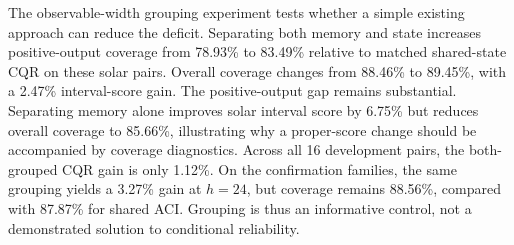 The observable-width grouping experiment tests whether a simple existing approach
can reduce the deficit. Separating both memory and state increases positive-output
coverage from 78.93\% to 83.49\% relative to matched shared-state CQR on these solar
pairs. Overall coverage changes from 88.46\% to 89.45\%, with a 2.47\% interval-score
gain. The positive-output gap remains substantial. Separating memory alone improves
solar interval score by 6.75\% but reduces overall coverage to 85.66\%, illustrating
why a proper-score change should be accompanied by coverage diagnostics.
Across all 16 development pairs, the both-grouped CQR gain is only 1.12\%.
On the confirmation families, the same grouping yields a 3.27\% gain at $h=24$,
but coverage remains 88.56\%, compared with 87.87\% for shared ACI. Grouping is thus
an informative control, not a demonstrated solution to conditional reliability.

